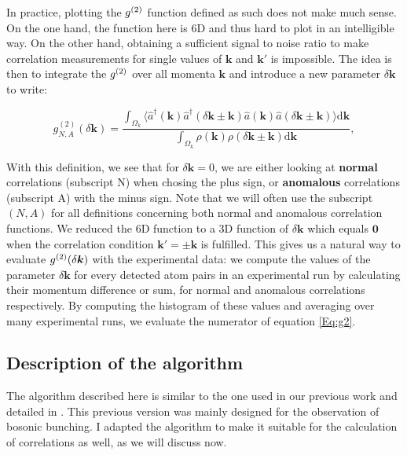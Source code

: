In practice, plotting the $g^{(2)}$ function defined as such does not make much sense. On the one hand, the function here is 6D and thus hard to plot in an intelligible way. On the other hand, obtaining a sufficient signal to noise ratio to make correlation measurements for single values of $\bm{k}$ and $\bm{k'}$ is impossible. The idea is then to integrate the $g^{(2)}$ over all momenta $\bm{k}$ and introduce a new parameter $\delta \bm{k}$ to write:

\begin{equation}
    g_{N,A}^{(2)} (\delta {\bm k})=\frac{\int_{\Omega_{k}} \langle \hat{a}^{\dagger}({\bm k}) \hat{a}^{\dagger}(\delta {\bm k} \pm {\bm k}) \hat{a}({\bm k}) \hat{a}(\delta {\bm k} \pm {\bm k}) \rangle \mathrm{d}{\bm k}}{\int_{\Omega_{k}} \rho({\bm k}) \rho(\delta {\bm k} \pm {\bm k}) \mathrm{d}\bm{k}},
    \label{Eq:g2}
\end{equation}

With this definition, we see that for $\delta \bm{k}=0$, we are either looking at \textbf{normal} \kk correlations (subscript N) when chosing the plus sign, or \textbf{anomalous} \kmk correlations (subscript A) with the minus sign. Note that we will often use the subscript $(N,A)$ for all definitions concerning both normal and anomalous correlation functions. We reduced the 6D function to a 3D function of $\delta \bm{k}$ which equals $\bm{0}$ when the correlation condition $\bm{k'} = \pm \bm{k}$ is fulfilled. This gives us a natural way to evaluate $g^{(2)} (\delta \bm{k})$ with the experimental data: we compute the values of the parameter $\delta \bm{k}$ for every detected atom pairs in an experimental run by calculating their momentum difference or sum, for normal and anomalous correlations respectively. By computing the histogram of these values and averaging over many experimental runs, we evaluate the numerator of equation \ref{Eq:g2}.

\subsection{Description of the algorithm}

The algorithm described here is similar to the one used in our previous work \cite{carcy2019momentum,cayla2020} and detailed in \cite{cayla_these,carcy_these}. This previous version was mainly designed for the observation of bosonic bunching. I adapted the algorithm to make it suitable for the calculation of \kmk correlations as well, as we will discuss now.

